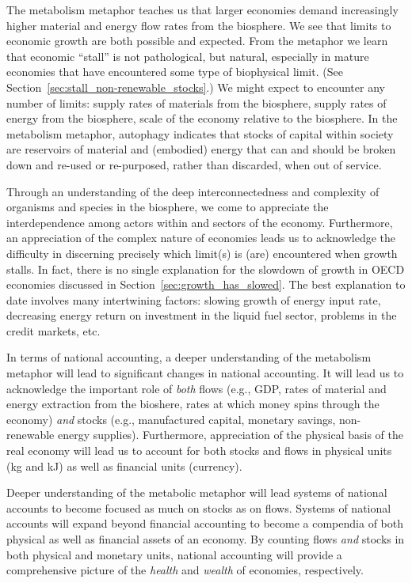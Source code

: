 The metabolism metaphor teaches us that 
larger economies demand increasingly higher
material and energy flow rates from the biosphere.
We see that limits to economic growth
are both possible and expected.
From the metaphor we learn that economic ``stall'' is not pathological, 
but natural, especially in mature economies 
that have encountered some type of biophysical limit.
(See Section~\ref{sec:stall_non-renewable_stocks}.)
We might expect to encounter any number of limits:
supply rates of materials from the biosphere,
supply rates of energy from the biosphere,
scale of the economy relative to the biosphere.
In the metabolism metaphor, autophagy indicates that stocks 
of capital within society are reservoirs of 
material and (embodied) energy that can and should be 
broken down and re-used or re-purposed,
rather than discarded, 
when out of service.

Through an understanding of the deep interconnectedness and complexity
of organisms and species in the biosphere, 
we come to appreciate the interdependence 
among actors within and sectors of the economy.
Furthermore, an appreciation of the complex nature of economies leads us 
to acknowledge the difficulty in discerning
precisely which limit(s) is (are) encountered when growth stalls.
In fact, there is no single explanation 
for the slowdown of growth in OECD economies 
discussed in Section~\ref{sec:growth_has_slowed}.
The best explanation to date involves many intertwining factors: 
slowing growth of energy input rate, 
decreasing energy return on investment in the liquid fuel sector,
problems in the credit markets, etc.

In terms of national accounting, 
a deeper understanding of the metabolism metaphor 
will lead to significant changes in national accounting.
It will lead us to acknowledge
the important role of \emph{both} flows 
(e.g., GDP, 
rates of material and energy extraction from the bioshere,
rates at which money spins through the economy)
\emph{and} stocks 
(e.g., manufactured capital, monetary savings, non-renewable energy supplies).
Furthermore, appreciation of the physical basis of the real economy will lead us 
to account for both stocks and flows 
in physical units (kg and kJ) as well as financial units (currency).

Deeper understanding of the metabolic metaphor will
lead systems of national accounts to become
focused as much on stocks as on flows.
Systems of national accounts will expand beyond financial accounting
to become a compendia of both physical as well as financial assets
of an economy.
By counting flows \emph{and} stocks 
in both physical and monetary units,
national accounting will provide a comprehensive picture 
of the \emph{health} and \emph{wealth} of economies, respectively.


